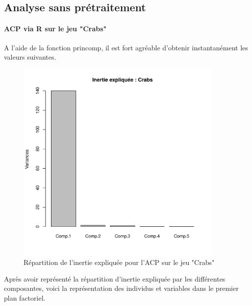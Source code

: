 \documentclass{report}
\begin{document}
\subsection{Analyse sans prétraitement}
\paragraph{ACP via R sur le jeu "Crabs"}
A l'aide de la fonction princomp, il est fort agréable d'obtenir instantanément les valeurs suivantes.
\begin{figure}[h!]
\begin{center}
    \includegraphics[width=0.9\textwidth]{plotcrabs.pdf}
    \caption{Répartition de l'inertie expliquée pour l'ACP sur le jeu "Crabs"}
\end{center}
\end{figure}
\newpage
Après avoir représenté la répartition d'inertie expliquée par les différentes composantes, voici la représentation des individus et variables dans le premier plan factoriel.
\end{document}
